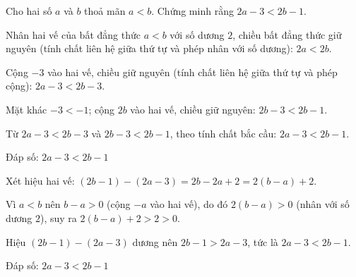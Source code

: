 \begin{problem}[9DS-BPT-013]
Cho hai số $a$ và $b$ thoả mãn $a < b$. Chứng minh rằng $2a - 3 < 2b - 1$.

\begin{solution}
Nhân hai vế của bất đẳng thức $a < b$ với số dương $2$, chiều bất đẳng thức giữ nguyên (tính chất liên hệ giữa thứ tự và phép nhân với số dương): $2a < 2b$.

Cộng $-3$ vào hai vế, chiều giữ nguyên (tính chất liên hệ giữa thứ tự và phép cộng): $2a - 3 < 2b - 3$.

Mặt khác $-3 < -1$; cộng $2b$ vào hai vế, chiều giữ nguyên: $2b - 3 < 2b - 1$.

Từ $2a - 3 < 2b - 3$ và $2b - 3 < 2b - 1$, theo tính chất bắc cầu: $2a - 3 < 2b - 1$.

Đáp số: $\boxed{2a - 3 < 2b - 1}$
\end{solution}

\begin{solution}
Xét hiệu hai vế: $(2b - 1) - (2a - 3) = 2b - 2a + 2 = 2(b - a) + 2$.

Vì $a < b$ nên $b - a > 0$ (cộng $-a$ vào hai vế), do đó $2(b - a) > 0$ (nhân với số dương $2$), suy ra $2(b - a) + 2 > 2 > 0$.

Hiệu $(2b - 1) - (2a - 3)$ dương nên $2b - 1 > 2a - 3$, tức là $2a - 3 < 2b - 1$.

Đáp số: $\boxed{2a - 3 < 2b - 1}$
\end{solution}
\end{problem}

